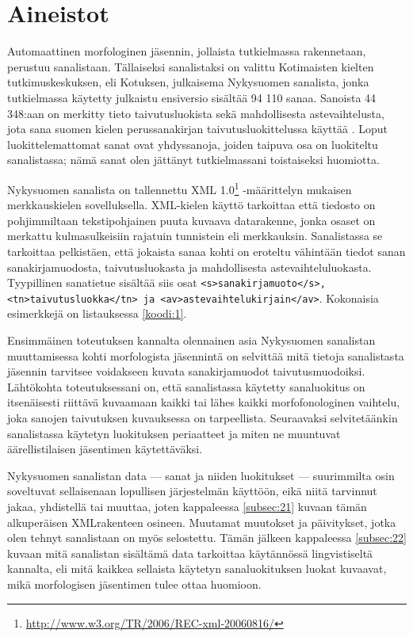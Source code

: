 \documentclass[free]{flammie}
\begin{document}
\section{Aineistot} \label{sec:aineistot}

Automaattinen morfologinen jäsennin, jollaista tutkielmassa rakennetaan,
perustuu sanalistaan. Tällaiseksi sanalistaksi on valittu Kotimaisten kielten
tutkimuskeskuksen, eli Kotuksen, julkaisema Nykysuomen sanalista, jonka
tutkielmassa käytetty julkaistu ensiversio sisältää 94 110 sanaa. Sanoista 44
348:aan on merkitty tieto taivutusluokista sekä mahdollisesta astevaihtelusta,
jota sana suomen kielen perussanakirjan taivutusluokittelussa käyttää
\cite{nykysuomensanalista2006}. Loput luokittelemattomat sanat ovat
yhdyssanoja, joiden taipuva osa on luokiteltu sanalistassa; nämä sanat olen
jättänyt tutkielmassani toistaiseksi huomiotta.

Nykysuomen sanalista on
tallennettu XML 1.0\footnote{\url{http://www.w3.org/TR/2006/REC-xml-20060816/}}
-määrittelyn mukaisen merkkauskielen sovelluksella.
XML-kielen käyttö tarkoittaa että tiedosto on pohjimmiltaan tekstipohjainen
puuta kuvaava datarakenne, jonka osaset on merkattu kulmasulkeisiin rajatuin
tunnistein eli merkkauksin. Sanalistassa se tarkoittaa pelkistäen, että jokaista
sanaa kohti on eroteltu vähintään tiedot sanan sanakirjamuodosta,
taivutusluokasta ja mahdollisesta astevaihteluluokasta. Tyypillinen sanatietue
sisältää siis osat \texttt{<s>sanakirjamuoto</s>, <tn>taivutusluokka</tn> ja
<av>astevaihtelukirjain</av>}. Kokonaisia esimerkkejä on listauksessa
\ref{koodi:1}.

Ensimmäinen toteutuksen kannalta olennainen asia Nykysuomen sanalistan
muuttamisessa kohti morfologista jäsennintä on selvittää mitä tietoja
sanalistasta jäsennin tarvitsee voidakseen kuvata sanakirjamuodot
taivutusmuodoiksi. Lähtökohta toteutuksessani on, että sanalistassa käytetty
sanaluokitus on itsenäisesti riittävä kuvaamaan kaikki tai lähes kaikki
morfofonologinen vaihtelu, joka sanojen taivutuksen kuvauksessa on tarpeellista.
Seuraavaksi selvitetäänkin sanalistassa käytetyn luokituksen periaatteet ja
miten ne muuntuvat äärellistilaisen jäsentimen käytettäväksi.

Nykysuomen
sanalistan data — sanat ja niiden luokitukset — suurimmilta osin soveltuvat
sellaisenaan lopullisen järjestelmän käyttöön, eikä niitä tarvinnut jakaa,
yhdistellä tai muuttaa, joten kappaleessa \ref{subsec:21} kuvaan tämän alkuperäisen
XMLrakenteen osineen. Muutamat muutokset ja päivitykset, jotka olen tehnyt
sanalistaan on myös selostettu. Tämän jälkeen kappaleessa \ref{subsec:22} kuvaan mitä
sanalistan sisältämä data tarkoittaa käytännössä lingvistiseltä kannalta, eli
mitä kaikkea sellaista käytetyn sanaluokituksen luokat kuvaavat, mikä
morfologisen jäsentimen tulee ottaa huomioon.
\end{document}
